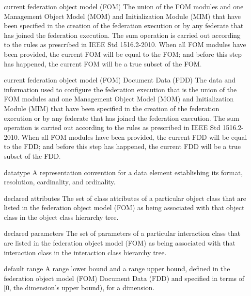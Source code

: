 \begin{definition}{current federation object model (FOM)}
    The union of the FOM modules and one Management Object Model (MOM) and Initialization Module (MIM) that have been specified in the creation of the federation execution or by any federate that has joined the federation execution. The sum operation is carried out according to the rules as prescribed in IEEE Std 1516.2-2010. When all FOM modules have been provided, the current FOM will be equal to the FOM; and before this step has happened, the current FOM will be a true subset of the FOM.
\end{definition}

\begin{definition}{current federation object model (FOM) Document Data (FDD)}
    The data and information used to configure the federation execution that is the union of the FOM modules and one Management Object Model (MOM) and Initialization Module (MIM) that have been specified in the creation of the federation execution or by any federate that has joined the federation execution. The sum operation is carried out according to the rules as prescribed in IEEE Std 1516.2-2010. When all FOM modules have been provided, the current FDD will be equal to the FDD; and before this step has happened, the current FDD will be a true subset of the FDD.
\end{definition}

\begin{definition}{datatype}
    A representation convention for a data element establishing its format, resolution, cardinality, and ordinality.
\end{definition}

\begin{definition}{declared attributes}
    The set of class attributes of a particular object class that are listed in the federation object model (FOM) as being associated with that object class in the object class hierarchy tree.
\end{definition}

\begin{definition}{declared parameters}
    The set of parameters of a particular interaction class that are listed in the federation object model (FOM) as being associated with that interaction class in the interaction class hierarchy tree.
\end{definition}

\begin{definition}{default range}
    A range lower bound and a range upper bound, defined in the federation object model (FOM) Document Data (FDD) and specified in terms of [0, the dimension's upper bound), for a dimension.
\end{definition}

